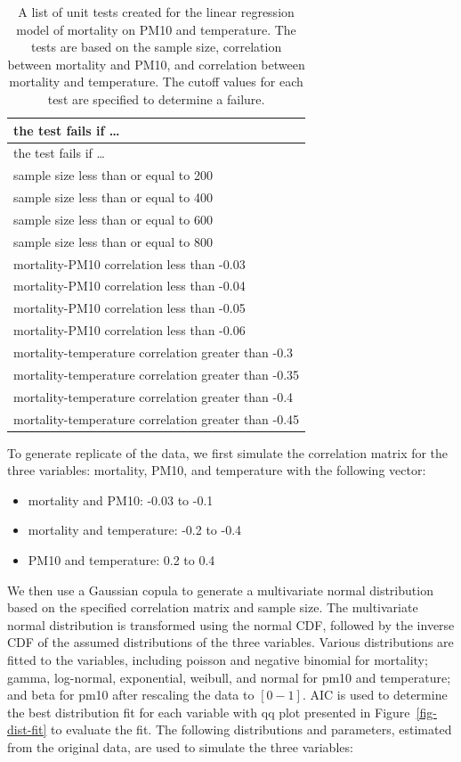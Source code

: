 \documentclass[
]{jds}
\providecommand{\tightlist}{%
  \setlength{\itemsep}{0pt}\setlength{\parskip}{0pt}}\usepackage{longtable,booktabs,array}
\begin{document}
\begin{longtable}[]{@{}l@{}}
\caption{A list of unit tests created for the linear regression model of
mortality on PM10 and temperature. The tests are based on the sample
size, correlation between mortality and PM10, and correlation between
mortality and temperature. The cutoff values for each test are specified
to determine a failure.}\label{tbl-tests}\tabularnewline
\toprule\noalign{}
the test fails if \ldots{} \\
\midrule\noalign{}
\endfirsthead
\toprule\noalign{}
the test fails if \ldots{} \\
\midrule\noalign{}
\endhead
\bottomrule\noalign{}
\endlastfoot
sample size less than or equal to 200 \\
sample size less than or equal to 400 \\
sample size less than or equal to 600 \\
sample size less than or equal to 800 \\
mortality-PM10 correlation less than -0.03 \\
mortality-PM10 correlation less than -0.04 \\
mortality-PM10 correlation less than -0.05 \\
mortality-PM10 correlation less than -0.06 \\
mortality-temperature correlation greater than -0.3 \\
mortality-temperature correlation greater than -0.35 \\
mortality-temperature correlation greater than -0.4 \\
mortality-temperature correlation greater than -0.45 \\
\end{longtable}

To generate replicate of the data, we first simulate the correlation
matrix for the three variables: mortality, PM10, and temperature with
the following vector:

\begin{itemize}
\tightlist
\item
  mortality and PM10: -0.03 to -0.1
\item
  mortality and temperature: -0.2 to -0.4
\item
  PM10 and temperature: 0.2 to 0.4
\end{itemize}

We then use a Gaussian copula to generate a multivariate normal
distribution based on the specified correlation matrix and sample size.
The multivariate normal distribution is transformed using the normal
CDF, followed by the inverse CDF of the assumed distributions of the
three variables. Various distributions are fitted to the variables,
including poisson and negative binomial for mortality; gamma,
log-normal, exponential, weibull, and normal for pm10 and temperature;
and beta for pm10 after rescaling the data to \([0-1]\). AIC is used to
determine the best distribution fit for each variable with qq plot
presented in Figure~\ref{fig-dist-fit} to evaluate the fit. The
following distributions and parameters, estimated from the original
data, are used to simulate the three variables:
\end{document}
